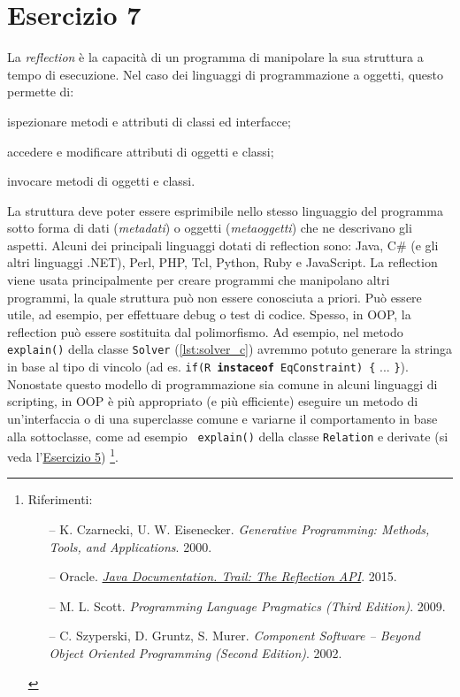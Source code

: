 \section*{Esercizio 7}

La \emph{reflection} è la capacità di un programma di manipolare la sua
struttura a tempo di esecuzione. Nel caso dei linguaggi di programmazione a oggetti, questo permette di: %
%
\begin{enumerate*}
    \item ispezionare metodi e attributi di classi ed interfacce;
    \item accedere e modificare attributi di oggetti e classi;
    \item invocare metodi di oggetti e classi.
\end{enumerate*}
%
La struttura deve poter essere esprimibile nello stesso linguaggio del programma
sotto forma di dati (\emph{metadati}) o oggetti (\emph{metaoggetti}) che ne
descrivano gli aspetti.
%
Alcuni dei principali linguaggi dotati di reflection sono: Java, C\# (e gli
altri linguaggi .NET), Perl, PHP, Tcl, Python, Ruby e JavaScript. La reflection
viene usata principalmente per creare programmi che manipolano altri programmi,
la quale struttura può non essere conosciuta a priori. Può essere utile, ad
esempio, per effettuare debug o test di codice. Spesso, in OOP, la reflection
può essere sostituita dal polimorfismo. Ad esempio, nel metodo {\tt explain()}
della classe {\tt Solver} (\autoref{lst:solver_c}) avremmo potuto generare la
stringa in base al tipo di vincolo (ad es. \texttt{if(R \textbf{instaceof}
EqConstraint) \{} ... {\tt \}}). Nonostate questo modello di programmazione sia
comune in alcuni linguaggi di scripting, in OOP è più appropriato (e più
efficiente) eseguire un metodo di un'interfaccia o di una superclasse comune e
variarne il comportamento in base alla sottoclasse, come ad esempio {\tt
explain()} della classe {\tt Relation} e derivate (si veda
l'\hyperref[sec:ex5]{Esercizio 5})
%
\footnote{Riferimenti:%
\begin{itemize}[noitemsep,topsep=0pt]
    \item[--] K. Czarnecki, U. W. Eisenecker. \emph{Generative Programming:
    Methods, Tools, and Applications}. 2000.
    \item[--] Oracle.
    \href{http://docs.oracle.com/javase/tutorial/reflect/index.html}{
    \emph{Java\texttrademark{} Documentation. Trail: The Reflection API}}. 2015.
    \item[--] M. L. Scott. \emph{Programming Language Pragmatics (Third
    Edition)}. 2009.
    \item[--] C. Szyperski, D. Gruntz, S. Murer. \emph{Component Software --
    Beyond Object Oriented Programming (Second Edition)}. 2002.
\end{itemize}}.
